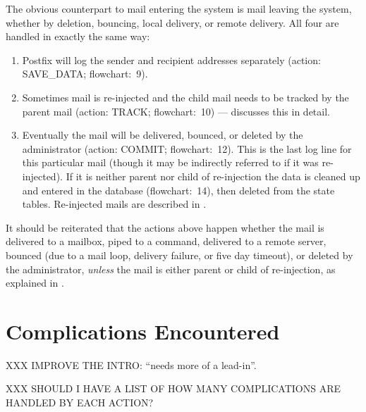 \label{mail-delivery}

The obvious counterpart to mail entering the system is mail leaving the
system, whether by deletion, bouncing, local delivery, or remote delivery.
All four are handled in exactly the same way:

\begin{enumerate}

    \item Postfix will log the sender and recipient addresses separately
        (action: SAVE\_DATA\@; flowchart:~9).

    \item Sometimes mail is re-injected and the child mail needs to be
        tracked by the parent mail (action: TRACK\@; flowchart:~10) ---
         discusses this in
        detail.

    \item Eventually the mail will be delivered, bounced, or deleted by the
        administrator (action: COMMIT\@; flowchart:~12).  This is the last
        log line for this particular mail (though it may be indirectly
        referred to if it was re-injected).  If it is neither parent nor
        child of re-injection the data is cleaned up and entered in the
        database (flowchart:~14), then deleted from the state tables.
        Re-injected mails are described in .

\end{enumerate}

It should be reiterated that the actions above happen whether the mail is
delivered to a mailbox, piped to a command, delivered to a remote server,
bounced (due to a mail loop, delivery failure, or five day timeout), or
deleted by the administrator, \textit{unless\/} the mail is either parent
or child of re-injection, as explained in .

\section{Complications Encountered}

\label{complications}

XXX IMPROVE THE INTRO\@: ``needs more of a lead-in''.

XXX SHOULD I HAVE A LIST OF HOW MANY COMPLICATIONS ARE HANDLED BY EACH
ACTION\@?

